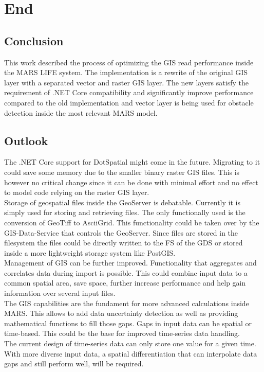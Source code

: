 
\chapter{End}



\section{Conclusion}
This work described the process of optimizing the GIS read performance inside the MARS LIFE system. The implementation is a rewrite of the original GIS layer with a separated vector and raster GIS layer. The new layers satisfy the requirement of .NET Core compatibility and significantly improve performance compared to the old implementation and vector layer is being used for obstacle detection inside the most relevant MARS model.


\section{Outlook}
The .NET Core support for DotSpatial might come in the future. Migrating to it could save some memory due to the smaller binary raster GIS files. This is however no critical change since it can be done with minimal effort and no effect to model code relying on the raster GIS layer.\\
Storage of geospatial files inside the GeoServer is debatable. Currently it is simply used for storing and retrieving files. The only functionally used is the conversion of GeoTiff to AsciiGrid. This functionality could be taken over by the GIS-Data-Service that controls the GeoServer. Since files are stored in the filesystem the files could be directly written to the FS of the GDS or stored inside a more lightweight storage system like PostGIS.\\
Management of GIS can be further improved. Functionality that aggregates and correlates data during import is possible. This could combine input data to a common spatial area, save space, further increase performance and help gain information over several input files.\\
The GIS capabilities are the fundament for more advanced calculations inside MARS. This allows to add data uncertainty detection as well as providing mathematical functions to fill those gaps. Gaps in input data can be spatial or time-based. This could be the base for improved time-series data handling.\\
The current design of time-series data can only store one value for a given time. With more diverse input data, a spatial differentiation that can interpolate data gaps and still perform well, will be required.
